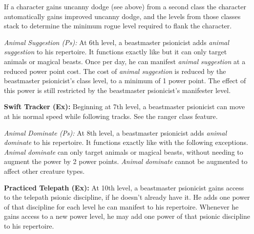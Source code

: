 {If a character gains uncanny dodge (see above) from a second class the character automatically gains improved uncanny dodge, and the levels from those classes stack to determine the minimum rogue level required to flank the character.

\textit{Animal Suggestion (Ps):} At 6th level, a beastmaster psionicist adds \emph{animal suggestion} to his repertoire. It functions exactly like  but it can only target animals or magical beasts. Once per day, he can manifest \emph{animal suggestion} at a reduced power point cost. The cost of \emph{animal suggestion} is reduced by the beastmaster psionicist's class level, to a minimum of 1 power point. The effect of this power is still restricted by the beastmaster psionicist's manifester level.

\textbf{Swift Tracker (Ex):} Beginning at 7th level, a beastmaster psionicist can move at his normal speed while following tracks. See the ranger class feature.

\textit{Animal Dominate (Ps):} At 8th level, a beastmaster psionicist adds \emph{animal dominate} to his repertoire. It functions exactly like  with the following exceptions. \emph{Animal dominate} can only target animals or magical beasts, without needing to augment the power by 2 power points. \emph{Animal dominate} cannot be augmented to affect other creature types.

\textbf{Practiced Telepath (Ex):} At 10th level, a beastmaster psionicist gains access to the telepath psionic discipline, if he doesn't already have it. He adds one power of that discipline for each level he can manifest to his repertoire. Whenever he gains access to a new power level, he may add one power of that psionic discipline to his repertoire.

}
